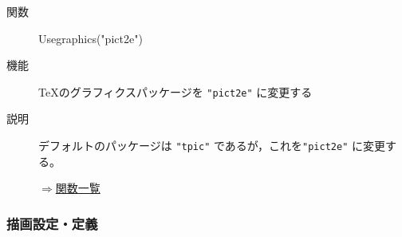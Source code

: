 \documentclass[papersize,a4paper,12pt,uplatex]{jsarticle}
\begin{document}
\begin{description}
\vspace{\baselineskip}
\hypertarget{usegraphics}{}
\item[関数]  Usegraphics("pict2e")
\item[機能]  TeXのグラフィクスパッケージを  \verb|"pict2e"| に変更する
\item[説明]  デフォルトのパッケージは \verb|"tpic"| であるが，これを\verb|"pict2e"| に変更する。


\begin{flushright}  \hyperlink{functionlist}{$\Rightarrow$関数一覧}\end{flushright}

\end{description}

\subsubsection{描画設定・定義}
\end{document}
